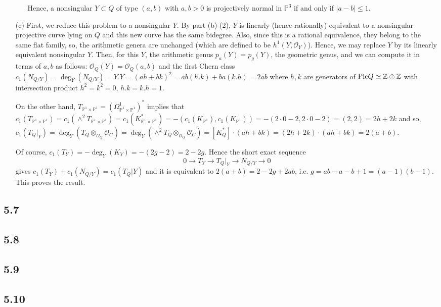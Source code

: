 \documentclass[11pt]{amsart}          %
\newcommand{\calO}{\mathcal{O}}
\newcommand{\bbZ}{\mathbb{Z}}
\newcommand{\bbP}{\mathbb{P}}
\newcommand{\pic}{{\rm Pic}}
\begin{document}
\begin{enumerate}
\begin{enumerate}
	Hence, a nonsingular $Y \subset Q$ of type $(a,b)$ with $a,b >0$ is projectively normal in $\bbP^3$ if and only if $|a-b | \leq 1$.
	\end{enumerate}
\item [(c)] First, we reduce this problem to a nonsingular $Y$. By part (b)-(2), $Y$ is linearly (hence rationally) equivalent to a nonsingular projective curve lying on $Q$ and this new curve has the same bidegree. Also, since this is a rational equivalence, they belong to the same flat family, so, the arithmetic genera are unchanged (which are defined to be $h^1(Y, \calO_Y)$). Hence, we may replace $Y$ by its linearly equivalent nonsingular $Y$. Then, for this $Y$, the arithmetic genus $p_a (Y) = p_g (Y)$, the geometric genus, and we can compute it in terms of $a,b$ as follows: $\calO_Q (Y) = \calO_Q (a,b)$ and the first Chern class $c_1 (N_{Q/Y}) = \deg _Y (N_{Q/Y}) = Y . Y = (ah + bk)^2 = ab (h.k) + ba (k.h) = 2ab$ where $h, k$ are generators of $\pic Q \simeq \bbZ \oplus \bbZ$ with intersection product $h^2 = k^2 = 0$, $h.k = k.h = 1$. 

On the other hand, $T_{\bbP^1 \times \bbP^1 } = \left( \Omega _{\bbP^1 \times \bbP^1} ^1 \right)^*$ implies that $c_1 \left( T_{\bbP^1 \times \bbP^1 } \right) = c_1 \left( \wedge ^2 T_{\bbP^1 \times \bbP^1 } \right) = c_1 \left( K_{\bbP^1 \times \bbP^1 } ^* \right) = - (c_1 (K_{\bbP^1}), c_1 (K_{\bbP^1})) = - (2 \cdot 0 - 2, 2 \cdot 0 - 2 ) = (2,2) = 2h + 2k$ and so, $c_1 (T_Q |_Y) = \deg _Y \left( T_Q \otimes_{\calO_Q} \calO_C \right) = \deg_Y \left( \wedge^2 T_Q \otimes_{\calO_Q} \calO_C \right) = [K_Q ^*] \cdot (ah + bk) = (2h + 2k) \cdot ( ah + bk) = 2 (a+b)$.

Of course, $c_1 (T_Y) = - \deg _Y (K_Y) = - (2g - 2) = 2 - 2g$. Hence the short exact sequence
$$0 \to T_Y \to T_Q |_Y \to N_{Q/Y} \to 0$$ gives $c_1 (T_Y) + c_1 (N_{Q/Y}) = c_1 (T_Q |Y)$ and it is equivalent to $2 (a+b) = 2 - 2g + 2ab$, i.e. $g = ab - a - b +1 = (a-1)(b-1)$. This proves the result.
\end{enumerate}

\subsection*{5.7}
\subsection*{5.8}
\subsection*{5.9}
\subsection*{5.10}
\end{document}
